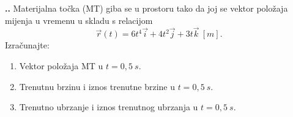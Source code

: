 
\noindent 
\textbf{
\thecjelina.\thezadatak.}
Materijalna točka (MT) giba se u prostoru tako da joj se vektor položaja mijenja u vremenu u skladu s relacijom
$$
\vec{r}(t)=6t^4\vec{i}+4t^2 \vec{j}+ 3t\vec{k} \ [m].
$$
Izračunajte:
\begin{enumerate}[label=(\alph*)]
  \item Vektor položaja MT u $t=0,5\ s$.
  \item Trenutnu brzinu i iznos trenutne brzine u $t=0,5\ s$.
  \item Trenutno ubrzanje i iznos trenutnog ubrzanja u $t=0,5\ s$.
\end{enumerate}

